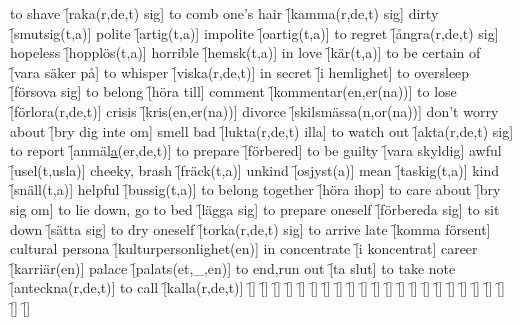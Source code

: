 \begin{questions}
\begin{multicols}{2}
        \question to shave \f[raka(r,de,t) sig]
        \question to comb one's hair \f[kamma(r,de,t) sig]
        \question dirty \f[smutsig(t,a)]
        \question polite \f[artig(t,a)]
        \question impolite \f[oartig(t,a)]
        \question to regret \f[ångra(r,de,t) sig]
        \question hopeless \f[hopplös(t,a)]
        \question horrible \f[hemsk(t,a)]
        \question in love \f[kär(t,a)]
        \question to be certain of \f[vara säker på]
        \question to whisper \f[viska(r,de,t)]
        \question in secret \f[i hemlighet]
        \question to oversleep \f[försova sig]
        \question to belong \f[höra till]
        \question comment \f[kommentar(en,er(na))]
        \question to lose \f[förlora(r,de,t)]
        \question crisis \f[kris(en,er(na))]
        \question divorce \f[skilsmässa(n,or(na))]
        \question don't worry about \f[bry dig inte om]
        \question smell bad \f[lukta(r,de,t) illa]
        \question to watch out \f[akta(r,de,t) sig]
        \question to report \f[anmäl\underline{a}(er,de,t)]
        \question to prepare \f[förbered]
        \question to be guilty \f[vara skyldig]
        \question awful \f[usel(t,usla)]
        \question cheeky, brash \f[fräck(t,a)]
        \question unkind \f[osjyst(a)]
        \question mean \f[taskig(t,a)]
        \question kind \f[snäll(t,a)]
        \question helpful \f[bussig(t,a)]
        \question to belong together \f[höra ihop]
        \question to care about \f[bry sig om]
        \question to lie down, go to bed \f[lägga sig]
        \question to prepare oneself \f[förbereda sig]
        \question to sit down \f[sätta sig]
        \question to dry oneself \f[torka(r,de,t) sig]
        \question to arrive late \f[komma försent]
        \question cultural persona \f[kulturpersonlighet(en)]
        \question in concentrate \f[i koncentrat]
        \question career \f[karriär(en)]
        \question palace \f[palats(et,\_,en)]
        \question to end,run out \f[ta slut]
        \question to take note \f[anteckna(r,de,t)]
        \question to call \f[kalla(r,de,t)]
        \question  \f[]
        \question \f[]
        \question \f[]
        \question \f[]
        \question \f[]
        \question \f[]
        \question \f[]
        \question \f[]
        \question \f[]
        \question \f[]
        \question \f[]
        \question \f[]
        \question \f[]
        \question \f[]
        \question \f[]
        \question \f[]
        \question \f[]
        \question \f[]
        \question \f[]
        \question \f[]
        \question \f[]
        \question \f[]
        \question \f[]

\end{multicols}
\end{questions}
